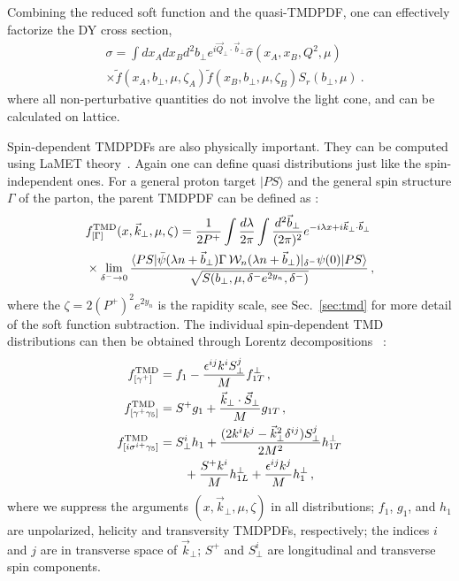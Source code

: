\documentclass[aps,rmp,reprint,amsmath,amssymb,graphicx,longbibliography]{revtex4-1} %
\newcommand{\nn}{\nonumber}
\DeclareRobustCommand{\sec}[1]{Sec.~\ref{sec:#1}}
\begin{document}
Combining the reduced soft function and the quasi-TMDPDF, one can effectively factorize the DY cross section,
\begin{align}
	&\sigma = \int dx_A dx_B d^2b_\perp e^{i\vec{Q}_\perp \cdot \vec{b}_\perp}\hat \sigma(x_A,x_B,Q^2,\mu)\nonumber \\ &\times \tilde f(x_A,b_\perp,\mu,\zeta_A) \tilde f(x_B,b_\perp,\mu,\zeta_B) S_r(b_\perp,\mu) \ .
\end{align}
where all non-perturbative quantities do not involve the light cone,
and can be calculated on lattice.

Spin-dependent TMDPDFs are also physically important. They can be computed
using LaMET theory~\cite{Ebert:2020gxr}. Again one can define quasi distributions just like the spin-independent ones.
For a general proton target $|PS\rangle$ and the general spin structure $\Gamma$ of the parton, the parent TMDPDF can be defined as :
\begin{align}\label{eq:parent_TMD}
	&f_{[\Gamma]}^{\rm TMD}(x,\vec{k}_\perp,\mu,\zeta)=\frac{1}{2P^+}\int\frac{d\lambda}{2\pi}\int\frac{d^2 \vec{b}_\perp}{(2\pi)^2}e^{-i\lambda x + i\vec{k}_\perp\cdot \vec{b}_\perp}\nonumber\\
	&\times \lim_{\delta^- \rightarrow 0}\frac{\langle PS|\bar\psi(\lambda n+\vec{b}_\perp)\Gamma\, {\cal W}_n(\lambda n +\vec{b}_\perp)|_{\delta^-}\psi(0)|PS\rangle}{\sqrt{S(b_\perp,\mu,\delta^-e^{2y_n},\delta^-)}} \,,
\end{align}
where the $\zeta=2(P^+)^2e^{2y_n}$ is the rapidity scale, see \sec{tmd} for more detail of the soft function subtraction. The individual spin-dependent TMD distributions can then be obtained through Lorentz decompositions ~\cite{Tangerman:1994eh,Ralston:1979ys,Mulders:1995dh}:
\begin{align}\label{eq:TMDPDF}
	f_{[\gamma^+]}^{\rm TMD}&=f_1-\frac{\epsilon^{ij}k^i S^j_\perp}{M}f_{1T}^\perp   \,,\\
	f_{[\gamma^+\gamma_5]}^{\rm TMD}&=S^+ g_1+\frac{\vec{k}_\perp\cdot \vec{S}_\perp}{M}g_{1T} \,, \\
	f_{[i\sigma^{i+}\gamma_5]}^{\rm TMD}&=S_\perp^i h_1+\frac{(2k^i k^j-\vec{k}_\perp^2\delta^{ij})S^j_\perp}{2M^2}h_{1T}^\perp\nn\\
	&\qquad+\frac{S^+ k^i}{M}h_{1L}^\perp+\frac{\epsilon^{ij} k^j}{M}h_1^\perp \,,
\end{align}
where we suppress the arguments $(x,\vec{k}_\perp,\mu,\zeta)$ in all distributions;
$f_1$, $g_1$, and $h_1$ are unpolarized, helicity and transversity TMDPDFs, respectively;
the indices $i$ and $j$ are in transverse space of $\vec{k}_\perp$; $S^+$ and $S^i_\perp$ are longitudinal and transverse spin components.
\end{document}
